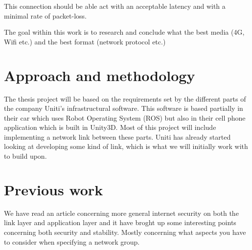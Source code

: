 \documentclass[a4paper]{article}
\begin{document}
This connection should be able act with an acceptable latency and with a minimal rate of packet-loss.

The goal within this work is to research and conclude what the best media (4G, Wifi etc.) and the best format (network protocol etc.)




\section{Approach and methodology}
The thesis project will be based on the requirements set by the different parts
of the company Uniti's infrastructural software. This software is based
partially in their car which uses Robot Operating System (ROS) but also in
their cell phone application which is built in Unity3D. Most of this project
will include implementing a network link between these parts. Uniti has
already started looking at developing some kind of link, which is what
we will initially work with to build upon.


\section{Previous work}
We have read an article \cite{NIST_report} concerning more general
internet security on both the link layer and application layer and
it have broght up some interesting points concerning both security and stability.
Mostly concerning what aspects you have to consider when specifying a network group.
\end{document}
